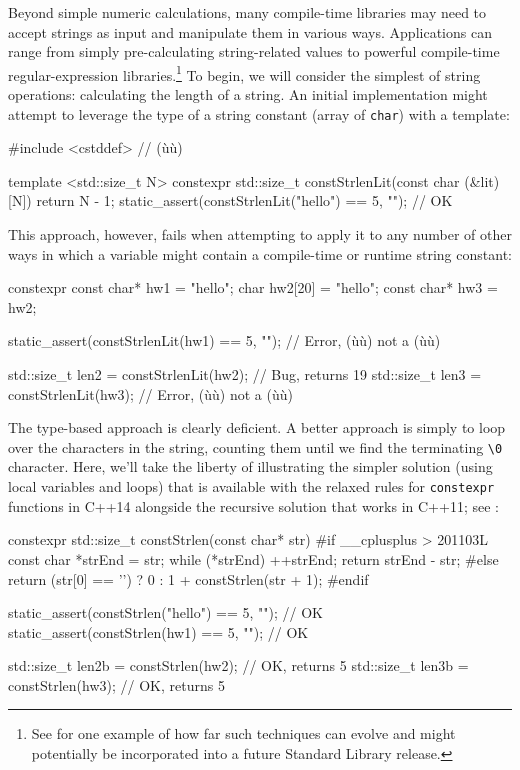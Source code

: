 Beyond simple numeric calculations, many compile-time libraries may need
to accept strings as input and manipulate them in various ways.
Applications can range from simply pre-calculating string-related values
to powerful compile-time regular-expression
libraries.{\cprotect\footnote{See \cite{dusikova19} for one example of how far such
techniques can evolve and might potentially be incorporated into a
  future Standard Library release.}} To begin, we will consider the
simplest of string operations: calculating the length of a string. An
initial implementation might attempt to leverage the type of a string
constant (array of \lstinline!char!) with a template:

\begin{emcppslisting}[emcppsbatch={e12,e13}]
#include <cstddef>  // (ù{}ù)

template <std::size_t N>
constexpr std::size_t constStrlenLit(const char (&lit)[N])
{
    return N - 1;
}
static_assert(constStrlenLit("hello") == 5, "");  // OK
\end{emcppslisting}


\noindent This approach, however, fails when attempting to apply it to any number
of other ways in which a variable might contain a compile-time or
runtime string constant:

\begin{emcppslisting}[emcppsbatch=e12]
constexpr const char* hw1     = "hello";
char                  hw2[20] = "hello";
const char*           hw3     = hw2;

static_assert(constStrlenLit(hw1) == 5, "");  // Error, (ù{}ù) not a (ù{}ù)

std::size_t len2 = constStrlenLit(hw2);  // Bug, returns 19
std::size_t len3 = constStrlenLit(hw3);  // Error, (ù{}ù) not a (ù{}ù)
\end{emcppslisting}


\noindent The type-based approach is clearly deficient. A better approach is
simply to loop over the characters in the string, counting them until we
find the terminating \lstinline!\0! character. Here, we'll take
the liberty of illustrating the simpler solution (using local variables
and loops) that is available with the relaxed rules for
\lstinline!constexpr! functions in C++14 alongside the recursive solution
that works in C++11; see :

\begin{emcppslisting}[emcppsbatch=e12]
constexpr std::size_t constStrlen(const char* str)
{
#if __cplusplus > 201103L
    const char *strEnd = str;
    while (*strEnd) ++strEnd;
    return strEnd - str;
#else
    return (str[0] == '\0') ? 0 : 1 + constStrlen(str + 1);
#endif
}

static_assert(constStrlen("hello") == 5, "");  // OK
static_assert(constStrlen(hw1)     == 5, "");  // OK

std::size_t len2b = constStrlen(hw2);  // OK, returns 5
std::size_t len3b = constStrlen(hw3);  // OK, returns 5
\end{emcppslisting}


